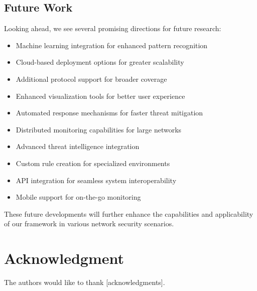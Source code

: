 \documentclass[conference]{IEEEtran}
\begin{document}
\subsection{Future Work}
Looking ahead, we see several promising directions for future research:
\begin{itemize}[leftmargin=*]
    \item Machine learning integration for enhanced pattern recognition
    \item Cloud-based deployment options for greater scalability
    \item Additional protocol support for broader coverage
    \item Enhanced visualization tools for better user experience
    \item Automated response mechanisms for faster threat mitigation
    \item Distributed monitoring capabilities for large networks
    \item Advanced threat intelligence integration
    \item Custom rule creation for specialized environments
    \item API integration for seamless system interoperability
    \item Mobile support for on-the-go monitoring
\end{itemize}

These future developments will further enhance the capabilities and applicability of our framework in various network security scenarios.

\section*{Acknowledgment}
The authors would like to thank [acknowledgments].
\end{document}
